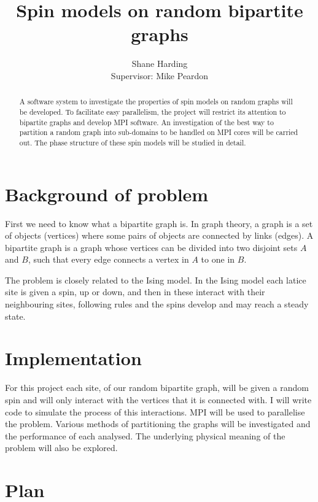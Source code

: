 \documentclass{article}
\begin{document}
\title{Spin models on random bipartite graphs}
\author{Shane Harding \\ Supervisor: Mike Peardon}

\maketitle

\begin{abstract}
A software system to investigate the properties of spin models on random graphs will be developed. To facilitate easy parallelism, the project will restrict its attention to bipartite graphs and develop MPI software. An investigation of the best way to partition a random graph into sub-domains to be handled on MPI cores will be carried out. The phase structure of these spin models will be studied in detail.
\end{abstract}

\section{Background of problem}

First we need to know what a bipartite graph is. In graph theory, a graph is a set of objects (vertices) where some pairs of objects are connected by links (edges). A bipartite graph is a graph whose vertices can be divided into two disjoint sets $A$ and $B$, such that every edge connects a vertex in $A$ to one in $B$.

The problem is closely related to the Ising model. In the Ising model each latice site is given a spin, up or down, and then in these interact with their neighbouring sites, following rules and the spins develop and may reach a steady state.

\section{Implementation}

For this project each site, of our random bipartite graph, will be given a random spin and will only interact with the vertices that it is connected with. I will write code to simulate the process of this interactions. MPI will be used to parallelise the problem. Various methods of partitioning the graphs will be investigated and the performance of each analysed. The underlying physical meaning of the problem will also be explored.

\section{Plan}
\end{document}
